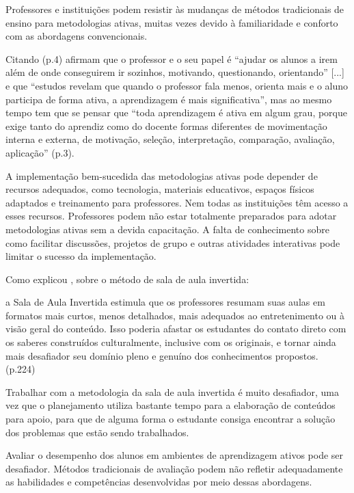 Professores e instituições podem resistir às mudanças de métodos tradicionais de ensino para metodologias ativas, muitas vezes devido à familiaridade e conforto com as abordagens convencionais.

Citando  (p.4) afirmam que o professor e o seu papel é ``ajudar os alunos a irem além de onde conseguirem ir sozinhos, motivando, questionando, orientando'' [...] e que ``estudos revelam que quando o professor fala menos, orienta mais e o aluno participa de forma ativa, a aprendizagem é mais significativa'', mas ao mesmo tempo tem que se pensar que ``toda aprendizagem é ativa em algum grau, porque exige tanto do aprendiz como do docente formas diferentes de movimentação interna e externa, de motivação, seleção, interpretação, comparação, avaliação, aplicação'' \cite{BACICHMORAN2018} (p.3).

A implementação bem-sucedida das metodologias ativas pode depender de recursos adequados, como tecnologia, materiais educativos, espaços físicos adaptados e treinamento para professores. Nem todas as instituições têm acesso a esses recursos. Professores podem não estar totalmente preparados para adotar metodologias ativas sem a devida capacitação. A falta de conhecimento sobre como facilitar discussões, projetos de grupo e outras atividades interativas pode limitar o sucesso da implementação.

Como explicou , sobre o método de sala de aula invertida:

\begin{citacao}
    a Sala de Aula Invertida estimula que os professores resumam suas aulas em formatos mais curtos, menos detalhados, mais adequados ao entretenimento ou à visão geral do conteúdo. Isso poderia afastar os estudantes do contato direto com os saberes construídos culturalmente, inclusive com os originais, e tornar ainda mais desafiador seu domínio pleno e genuíno dos conhecimentos propostos. \cite{VALERIO-MOREIRA2018} (p.224)
\end{citacao}

Trabalhar com a metodologia da sala de aula invertida é muito desafiador, uma vez que o planejamento utiliza bastante tempo para a elaboração de conteúdos para apoio, para que de alguma forma o estudante consiga encontrar a solução dos problemas que estão sendo trabalhados.

Avaliar o desempenho dos alunos em ambientes de aprendizagem ativos pode ser desafiador. Métodos tradicionais de avaliação podem não refletir adequadamente as habilidades e competências desenvolvidas por meio dessas abordagens.

